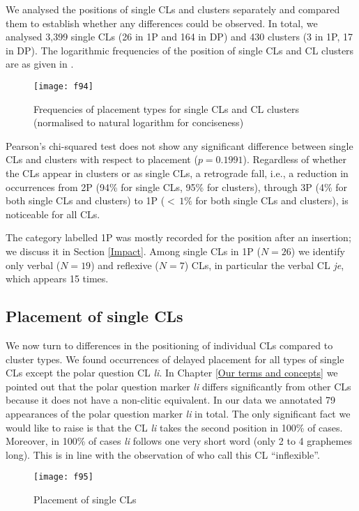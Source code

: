 We analysed the positions of single CLs and clusters separately and compared them to establish whether any differences could be observed. In total, we analysed 3,399 single CLs (26 in 1P and 164 in DP) and 430 clusters (3 in 1P, 17 in DP). The logarithmic frequencies of the position of single CLs and CL clusters are as given in .

\begin{figure}
\caption{Frequencies of placement types for single CLs and CL clusters (normalised to natural logarithm for conciseness)}
\label{F.9.4}
\texttt{[image: f94]}
\end{figure}

Pearson’s chi-squared test does not show any significant difference between single CLs and clusters with respect to placement ($p = 0.1991$). Regardless of whether the CLs appear in clusters or as single CLs, a retrograde fall, i.e., a reduction in occurrences from 2P (94\% for single CLs, 95\% for clusters), through 3P (4\% for both single CLs and clusters) to 1P ($<\,1\%$ for both single CLs and clusters), is noticeable for all CLs.

The category labelled 1P was mostly recorded for the position after an insertion; we discuss it in Section \ref{Impact}. Among single CLs in 1P ($N=26$) we identify only verbal ($N=19$) and reflexive ($N=7$) CLs, in particular the verbal CL \textit{je}, which appears 15 times.

\subsection{Placement of single CLs}

We now turn to differences in the positioning of individual CLs compared to cluster types. We found occurrences of delayed placement for all types of single CLs except the polar question CL \textit{li}. In Chapter \ref{Our terms and concepts} we pointed out that the polar question marker \textit{li} differs significantly from other CLs because it does not have a non-clitic equivalent. In our data we annotated 79 appearances of the polar question marker \textit{li} in total. The only significant fact we would like to raise is that the CL \textit{li} takes the second position in 100\% of cases. Moreover, in 100\% of cases \textit{li} follows one very short word (only 2 to 4 graphemes long). This is in line with the observation of \citet[119]{SiewierskaUhlirova98} who call this CL “inflexible”.

\begin{figure}
\caption{Placement of single CLs}
\label{F.9.5}
\texttt{[image: f95]}
\end{figure}

